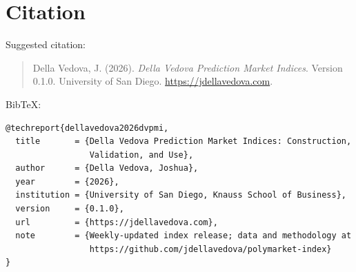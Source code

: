\documentclass[11pt,letterpaper]{article}
\begin{document}
\section{Citation}
\label{sec:cite}

Suggested citation:

\begin{quote}
Della Vedova, J. (2026). \emph{Della Vedova Prediction Market Indices}. Version 0.1.0. University of San Diego. \url{https://jdellavedova.com}.
\end{quote}

BibTeX:
\begin{verbatim}
@techreport{dellavedova2026dvpmi,
  title       = {Della Vedova Prediction Market Indices: Construction,
                 Validation, and Use},
  author      = {Della Vedova, Joshua},
  year        = {2026},
  institution = {University of San Diego, Knauss School of Business},
  version     = {0.1.0},
  url         = {https://jdellavedova.com},
  note        = {Weekly-updated index release; data and methodology at
                 https://github.com/jdellavedova/polymarket-index}
}
\end{verbatim}



\end{document}

